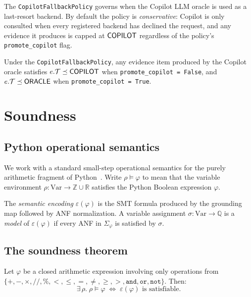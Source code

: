 \documentclass[11pt]{article}
\newcommand{\Enc}{\varepsilon}               %
\newcommand{\AffSys}{\Sigma}                 %
\begin{document}
The \texttt{CopilotFallbackPolicy} governs when the Copilot LLM
oracle is used as a last-resort backend.
By default the policy is \emph{conservative}: Copilot is only
consulted when every registered backend has declined the
request, and any evidence it produces is capped at
$\mathsf{COPILOT}$ regardless of the policy's \texttt{promote\_copilot}
flag.

\begin{proposition}\label{prop:trust-ceiling}
Under the \texttt{CopilotFallbackPolicy}, any evidence item
produced by the Copilot oracle satisfies
$e.\mathcal{T} \preceq \mathsf{COPILOT}$ when
\texttt{promote\_copilot = False}, and
$e.\mathcal{T} \preceq \mathsf{ORACLE}$ when
\texttt{promote\_copilot = True}.
\end{proposition}

\section{Soundness}\label{sec:soundness}

\subsection{Python operational semantics}

We work with a standard small-step operational semantics for the
purely arithmetic fragment of Python~\cite{python3}.
Write $\rho \models \varphi$ to mean that the variable
environment $\rho : \mathrm{Var} \to \mathbb{Z} \cup \mathbb{R}$
satisfies the Python Boolean expression $\varphi$.

\begin{definition}\label{def:semantic-enc}
The \emph{semantic encoding} $\Enc(\varphi)$ is the SMT formula
produced by the grounding map followed by ANF normalization.
A variable assignment $\sigma : \mathrm{Var} \to \mathbb{Q}$ is
a \emph{model} of $\Enc(\varphi)$ if every ANF in
$\AffSys_\varphi$ is satisfied by $\sigma$.
\end{definition}

\subsection{The soundness theorem}

\begin{theorem}\label{thm:soundness}
Let $\varphi$ be a closed \Python{} arithmetic expression
involving only operations from
$\{+, -, \times, \mathbin{//}, \mathbin{\%},
   <, \leq, =, \neq, \geq, >, \mathtt{and}, \mathtt{or},
   \mathtt{not}\}$.
Then:
\[
  \exists\,\rho.\; \rho \models \varphi
  \;\iff\;
  \Enc(\varphi) \text{ is satisfiable.}
\]
\end{theorem}
\end{document}
